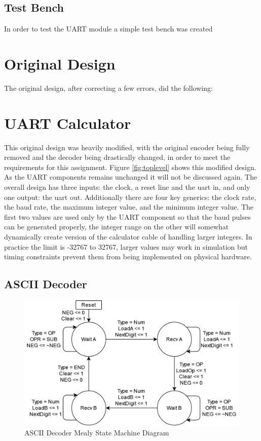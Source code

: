 \documentclass[11pt]{article}
\begin{document}
\subsection{Test Bench}
In order to test the UART module a simple test bench was created

\section{Original Design}
The original design, after correcting a few errors, did the following:

\section{UART Calculator}
This original design was heavily modified, with the original encoder being fully removed and the decoder being drastically changed, in order to meet the requirements for this assignment.
Figure \ref{fig:toplevel} shows this modified design.
As the UART components remains unchanged it will not be discussed again.
The overall design has three inputs: the clock, a reset line and the uart in, and only one output: the uart out.
Additionally there are four key generics: the clock rate, the baud rate, the maximum integer value, and the minimum integer value.
The first two values are used only by the UART component so that the baud pulses can be generated properly,
the integer range on the other will somewhat dynamically create version of the calculator cable of handling larger integers.
In practice the limit is -32767 to 32767, larger values may work in simulation but timing constraints prevent them from being implemented on physical hardware.


\subsection{ASCII Decoder}

\begin{figure}[H]        
    \centering
    \includegraphics[width=.66\textwidth]{DecoderSM.drawio.png}
    \caption{ASCII Decoder Mealy State Machine Diagram}
    \label{fig:decodersm}
\end{figure} 
\end{document}
